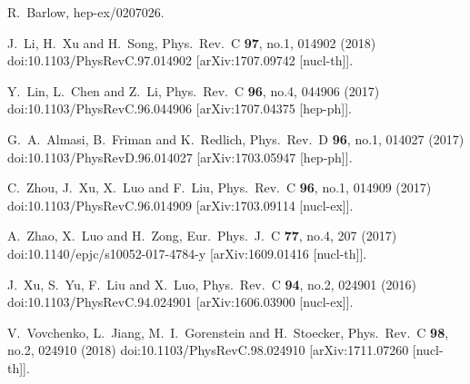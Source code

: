 \begin{thebibliography}{99}
  R.~Barlow,
  hep-ex/0207026.

  
J.~Li, H.~Xu and H.~Song,
Phys.\ Rev.\ C \textbf{97}, no.1, 014902 (2018)
doi:10.1103/PhysRevC.97.014902
[arXiv:1707.09742 [nucl-th]].

Y.~Lin, L.~Chen and Z.~Li,
Phys.\ Rev.\ C \textbf{96}, no.4, 044906 (2017)
doi:10.1103/PhysRevC.96.044906
[arXiv:1707.04375 [hep-ph]].

G.~A.~Almasi, B.~Friman and K.~Redlich,
Phys.\ Rev.\ D \textbf{96}, no.1, 014027 (2017)
doi:10.1103/PhysRevD.96.014027
[arXiv:1703.05947 [hep-ph]].

C.~Zhou, J.~Xu, X.~Luo and F.~Liu,
Phys.\ Rev.\ C \textbf{96}, no.1, 014909 (2017)
doi:10.1103/PhysRevC.96.014909
[arXiv:1703.09114 [nucl-ex]].

A.~Zhao, X.~Luo and H.~Zong,
Eur.\ Phys.\ J.\ C \textbf{77}, no.4, 207 (2017)
doi:10.1140/epjc/s10052-017-4784-y
[arXiv:1609.01416 [nucl-th]].


J.~Xu, S.~Yu, F.~Liu and X.~Luo,
Phys.\ Rev.\ C \textbf{94}, no.2, 024901 (2016)
doi:10.1103/PhysRevC.94.024901
[arXiv:1606.03900 [nucl-ex]].

V.~Vovchenko, L.~Jiang, M.~I.~Gorenstein and H.~Stoecker,
Phys.\ Rev.\ C \textbf{98}, no.2, 024910 (2018)
doi:10.1103/PhysRevC.98.024910
[arXiv:1711.07260 [nucl-th]].


\end{thebibliography}
